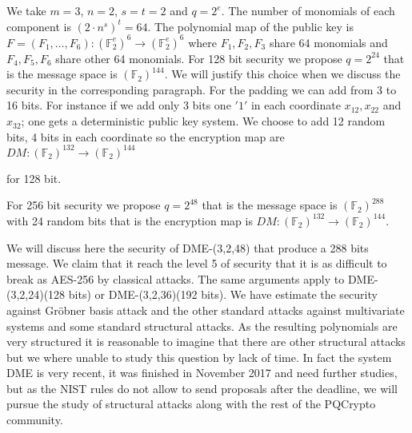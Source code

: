 \documentclass[12pt,a4paper]{amsart}
\theoremstyle{remark}
\theoremstyle{definition}
\begin{document}
We take $m=3$, $n=2$, $s=t=2$ and $q=2^e$. The number of monomials of each component is $(2\cdot n^s)^t=64$.
The polynomial map of the public key is $F=(F_1,\dots,F_6): (\mathbb{F}_2^e)^6 \to (\mathbb{F}_2^e)^6 $ where $F_1,F_2,F_3$ share
64 monomials and $F_4,F_5,F_6$ share other 64 monomials. 
For 128 bit security we propose $q=2^{24}$ that is the message space is $(\mathbb{F}_2)^{144}$.
We will justify this choice when we discuss the security in the corresponding paragraph.
For the padding we can add from 3 to 16 bits. For instance if we add only 3 bits one $'1'$ in 
each coordinate $x_{12},x_{22}$ and $x_{32}$; one gets a deterministic public key system. 
We choose to add 12 random bits, 4 bits in each coordinate so the encryption map are 
$DM: (\mathbb{F}_2)^{132}\to (\mathbb{F}_2)^{144}$
\begin{center}
\end{center}
for 128 bit.

For 256 bit security we propose $q=2^{48}$ that is the message space is 
$(\mathbb{F}_2)^{288}$ with 24 random bits that is the  encryption map is 
$DM: (\mathbb{F}_2)^{132}\to (\mathbb{F}_2)^{144}.$
\begin{center}
\end{center}



We will discuss here the security of DME-(3,2,48) that produce a 288 bits message. We claim that it reach the level 5 of security 
that  it is as difficult to break as AES-256 by classical attacks. The same arguments apply to  DME-(3,2,24)(128 bits) or  
DME-(3,2,36)(192 bits). We have estimate the security against Gr{\"o}bner basis attack and the other standard attacks against multivariate
systems and some standard  structural attacks. As the resulting polynomials are very structured it is reasonable to imagine that 
there are other structural attacks but we where unable to study this question by lack of time.  In fact the system DME is very recent, 
it was finished in November 2017 and need further studies, but as the NIST rules do not allow to  send  proposals after the deadline, 
we will pursue the study of structural attacks along with the rest of the PQCrypto community.
\end{document}
